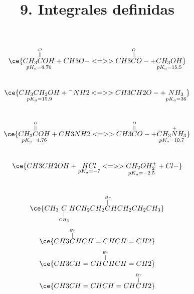 \documentclass[11pt,letterpaper]{article}
\title{9. Integrales definidas}
\begin{document}
\[
    \ce{\underset{pK_a=4.76}{CH_3\overset{\overset{O}{\parallel}}{C}OH} + CH3O- <=>> CH3\overset{\overset{O}{\parallel}}{C}O- + \underset{pK_a=15.5}{CH_3OH}} 
\]
\:\\
\[
    \ce{\underset{pK_a=15.9}{CH_3CH_2OH} + {^-}NH2 <=>> CH3CH2O- + \underset{pK_a=36}{NH_3}}
\]
\:\\
\[
    \ce{\underset{pK_a=4.76}{CH_3\overset{\overset{O}{\parallel}}{C}OH} + CH3NH2 <=>> CH3\overset{\overset{O}{\parallel}}{C}O- + \underset{pK_a=10.7}{CH_3\overset{+}{N}H_3}}
\]
\:\\
\[
    \ce{CH3CH2OH + \underset{pK_a=-7}{HCl} <=>> \underset{pK_a=-2.5}{CH_2OH_2^+} + Cl-}
\]
\:\\
\[
    \ce{CH_3\underset{\underset{CH_3}{|}}{C}HCH_2CH_2\overset{\overset{Br}{|}}{C}HCH_2CH_2CH_3}
\]
\[
   \ce{CH3\overset{\overset{Br}{|}}{C}HCH=CHCH=CH2}
\]
\[
    \ce{CH3CH=CH\overset{\overset{Br}{|}}{C}HCH=CH2}
\]
\[
    \ce{CH3CH=CHCH=CH\overset{\overset{Br}{|}}{C}H2}
\]
\end{document}

